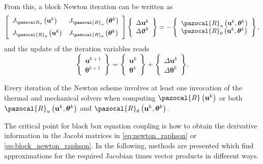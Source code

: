 From this, a block Newton iteration can be written as
\begin{equation} \label{eq:block_newton_raphson}
\left[\begin{array}{ll}J_{\pazocal R_{u}}\left(\mathbf{u}^{k}\right) & J_{\pazocal{R}_{u}}\left(\boldsymbol{\theta}^{k}\right) \\[7pt] J_{\pazocal{R}_{\theta}}\left(\mathbf{u}^{k}\right) & J_{\pazocal{R}_{\theta}}\left(\boldsymbol{\theta}^{k}\right)\end{array}\right]
\left\{\begin{array}{c}\Delta \mathbf{u}^{k} \\ \Delta \bm{\uptheta}^{k}\end{array}\right\}
=-\left\{\begin{array}{l}\pazocal{R}_{u}\left(\mathbf{u}^{k}, \boldsymbol{\theta}^{k}\right) \\ \pazocal{R}_{\theta}\left(\mathbf{u}^{k}, \boldsymbol{\theta}^{k}\right)\end{array}\right\},
\end{equation}
and the update of the iteration variables reads
\begin{equation}
\left\{\begin{array}{l}
\mathbf{u}^{k+1} \\
\boldsymbol{\theta}^{k+1}
\end{array}\right\}=\left\{\begin{array}{l}
\mathbf{u}^{k} \\
\boldsymbol{\theta}^{k}
\end{array}\right\}+\left\{\begin{array}{c}
\Delta \mathbf{u}^{k} \\
\Delta \boldsymbol{\theta}^{k}
\end{array}\right\}.
\end{equation}

Every iteration of the Newton scheme involves at least one invocation of the thermal and mechanical solvers when computing $\pazocal{R}\left(\mathbf{u}^{k}\right)$ or both $\pazocal{R}_{u}\left(\mathbf{u}^{k}, \boldsymbol{\theta}^{k}\right)$ and $\pazocal{R}_{\theta}\left(\mathbf{u}^{k}, \boldsymbol{\theta}^{k}\right)$.

The critical point for black box equation coupling is how to obtain the derivative information in the Jacobi matrices in \eqref{eq:newton_raphson} or \eqref{eq:block_newton_raphson}.
In the following, methods are presented which find approximations for the required Jacobian times vector products in different ways.

